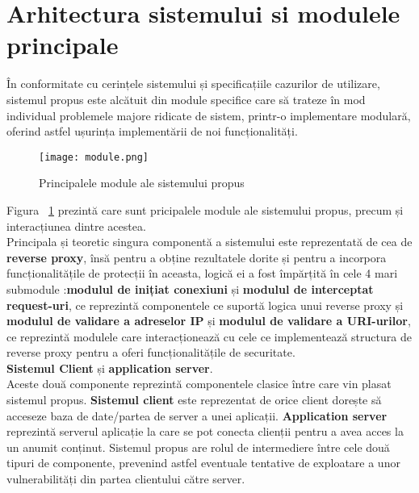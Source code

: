\newpage


\section{Arhitectura sistemului si modulele principale}

În conformitate cu cerințele sistemului și specificațiile cazurilor de utilizare, sistemul propus este alcătuit din module specifice care să trateze în mod individual problemele majore ridicate de sistem, printr-o implementare modulară, oferind astfel ușurința implementării de noi funcționalități. 

\begin{figure}[h]
	\centering
	\texttt{[image: module.png]}
	\caption{Principalele module ale sistemului propus}
	\label{fig:module}
\end{figure}
Figura ~\ref{fig:module}  prezintă care sunt pricipalele module ale sistemului propus, precum și interacțiunea dintre acestea. \\

Principala și teoretic singura componentă a sistemului este reprezentată de cea de \textbf{reverse proxy}, însă pentru a obține rezultatele dorite și pentru a incorpora funcționalitățile de protecții în aceasta, logică ei a fost împărțită în cele 4 mari submodule :\textbf{modulul de inițiat conexiuni} și \textbf{modulul de interceptat request-uri}, ce reprezintă componentele ce suportă logica unui reverse proxy și \textbf{modulul de validare a adreselor IP} și \textbf{modulul de validare a URI-urilor}, ce reprezintă modulele care interacționează cu cele ce implementează structura de reverse proxy pentru a oferi funcționalitățile de securitate. \\




\textbf{Sistemul Client} și  \textbf{application server}.\\ 

Aceste două componente reprezintă componentele clasice între care vin plasat sistemul propus. \textbf{Sistemul client} este reprezentat de orice client dorește să acceseze baza de date/partea de server a unei aplicații. \textbf{Application server} reprezintă serverul aplicație la care se pot conecta clienții pentru a avea acces la un anumit conținut. Sistemul propus are rolul de intermediere între cele două tipuri de componente, prevenind astfel eventuale tentative de exploatare a unor vulnerabilități din partea clientului către server.


